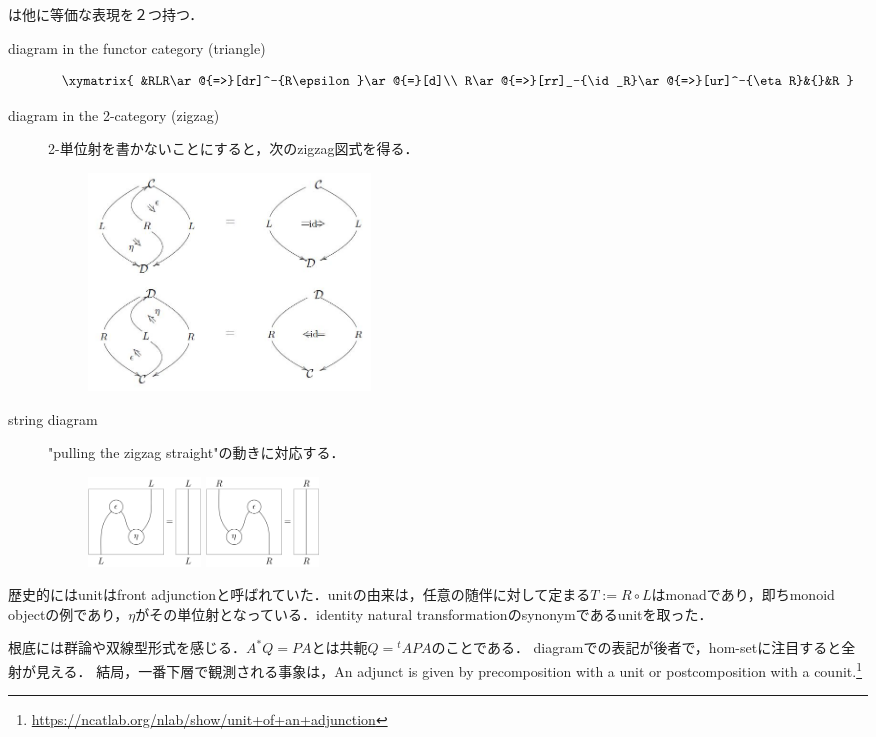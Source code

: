 \documentclass[uplatex,dvipdfmx]{jsreport}
\begin{document}
\begin{remark}
    は他に等価な表現を２つ持つ．
    \begin{description}
        \item[diagram in the functor category (triangle)] 
        \[\xymatrix{
            &RLR\ar@{=>}[dr]^-{R\epsilon}\ar@{=}[d]\\
            R\ar@{=>}[rr]_-{\id_R}\ar@{=>}[ur]^-{\eta R}&{}&R
        }\]
        \item[diagram in the 2-category (zigzag)]
        2-単位射を書かないことにすると，次のzigzag図式を得る．
        \begin{figure}[h]
            \includegraphics[width=7.5cm]{./media/Adjointness.jpg}
        \end{figure}
        \item[string diagram]
        "pulling the zigzag straight"の動きに対応する．
        \begin{figure}[h]
            \includegraphics[width=3cm]{./media/adjunction-up-string.png}
            \includegraphics[width=3cm]{./media/adjunction-down-string.png}
        \end{figure}
    \end{description}
\end{remark}
\begin{remark}
    歴史的にはunitはfront adjunctionと呼ばれていた．unitの由来は，任意の随伴に対して定まる$T:=R\circ L$はmonadであり，即ちmonoid objectの例であり，$\eta$がその単位射となっている．identity natural transformationのsynonymであるunitを取った．
\end{remark}
\begin{remarks}
    根底には群論や双線型形式を感じる．$A^*Q=PA$とは共軛$Q={}^t\!APA$のことである．
    diagramでの表記が後者で，hom-setに注目すると全射が見える．
    結局，一番下層で観測される事象は，An adjunct is given by precomposition with a unit or postcomposition with a counit.\footnote{\url{https://ncatlab.org/nlab/show/unit+of+an+adjunction}}
\end{remarks}
\end{document}
